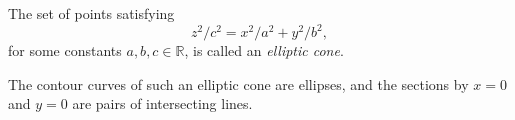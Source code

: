 \documentclass{ximera}
\begin{document}
\begin{example}
The set of points satisfying
\[
z^2/c^2 = x^2/a^2 + y^2/b^2,
\]
for some constants $a,b,c\in\mathbb{R}$, is called an \emph{elliptic cone}.

\begin{image}
\end{image}

The contour curves of such an elliptic cone are ellipses, and the sections by $x=0$ and $y=0$ are pairs of intersecting lines.
\end{example}
\end{document}
